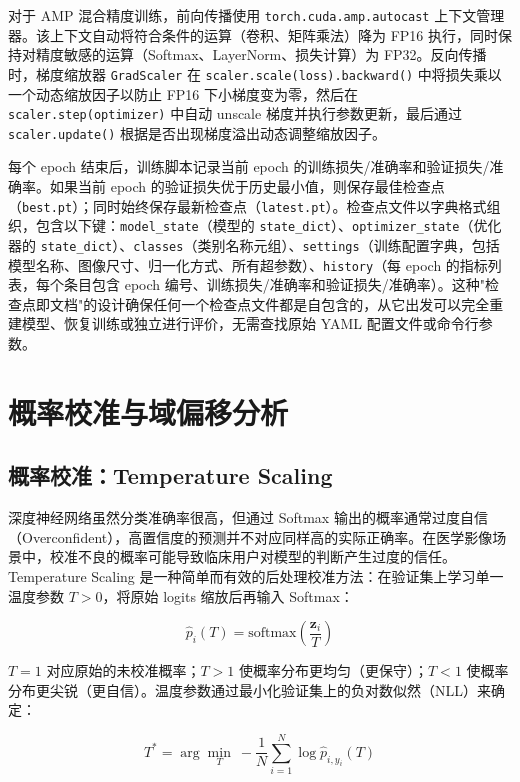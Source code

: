 \documentclass[12pt,a4paper,UTF8,openany]{ctexbook}
\begin{document}
对于 AMP 混合精度训练，前向传播使用 \texttt{torch.cuda.amp.autocast} 上下文管理器。该上下文自动将符合条件的运算（卷积、矩阵乘法）降为 FP16 执行，同时保持对精度敏感的运算（Softmax、LayerNorm、损失计算）为 FP32。反向传播时，梯度缩放器 \texttt{GradScaler} 在 \texttt{scaler.scale(loss).backward()} 中将损失乘以一个动态缩放因子以防止 FP16 下小梯度变为零，然后在 \texttt{scaler.step(optimizer)} 中自动 unscale 梯度并执行参数更新，最后通过 \texttt{scaler.update()} 根据是否出现梯度溢出动态调整缩放因子。

每个 epoch 结束后，训练脚本记录当前 epoch 的训练损失/准确率和验证损失/准确率。如果当前 epoch 的验证损失优于历史最小值，则保存最佳检查点（\texttt{best.pt}）；同时始终保存最新检查点（\texttt{latest.pt}）。检查点文件以字典格式组织，包含以下键：\texttt{model\_state}（模型的 \texttt{state\_dict}）、\texttt{optimizer\_state}（优化器的 \texttt{state\_dict}）、\texttt{classes}（类别名称元组）、\texttt{settings}（训练配置字典，包括模型名称、图像尺寸、归一化方式、所有超参数）、\texttt{history}（每 epoch 的指标列表，每个条目包含 epoch 编号、训练损失/准确率和验证损失/准确率）。这种"检查点即文档"的设计确保任何一个检查点文件都是自包含的，从它出发可以完全重建模型、恢复训练或独立进行评价，无需查找原始 YAML 配置文件或命令行参数。

\section{概率校准与域偏移分析}

\subsection{概率校准：Temperature Scaling}

深度神经网络虽然分类准确率很高，但通过 Softmax 输出的概率通常过度自信（Overconfident），高置信度的预测并不对应同样高的实际正确率\cite{guo2017}。在医学影像场景中，校准不良的概率可能导致临床用户对模型的判断产生过度的信任。Temperature Scaling 是一种简单而有效的后处理校准方法：在验证集上学习单一温度参数 $T > 0$，将原始 logits 缩放后再输入 Softmax：

\begin{equation}
\hat{p}_i(T) = \text{softmax}\left(\frac{\mathbf{z}_i}{T}\right)
\end{equation}

$T=1$ 对应原始的未校准概率；$T>1$ 使概率分布更均匀（更保守）；$T<1$ 使概率分布更尖锐（更自信）。温度参数通过最小化验证集上的负对数似然（NLL）来确定：

\begin{equation}
T^* = \arg\min_{T}\ -\frac{1}{N}\sum_{i=1}^{N}\log \hat{p}_{i, y_i}(T)
\end{equation}
\end{document}
